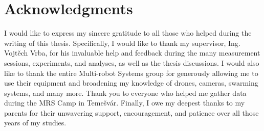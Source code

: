 
\section*{Acknowledgments}

I would like to express my sincere gratitude to all those who helped during the writing of this thesis.
Specifically, I would like to thank my supervisor, Ing. Vojtěch Vrba, for his invaluable help and feedback during the many
measurement sessions, experiments, and analyses, as well as the thesis discussions.
I would also like to thank the entire Multi-robot Systems group for generously allowing me to use their equipment and broadening my
knowledge of drones, cameras, swarming systems, and many more.
Thank you to everyone who helped me gather data during the MRS Camp in Temešvár.
Finally, I owe my deepest thanks to my parents for their unwavering support, encouragement, and patience over all those years of my studies.

\vspace{2.5cm}









